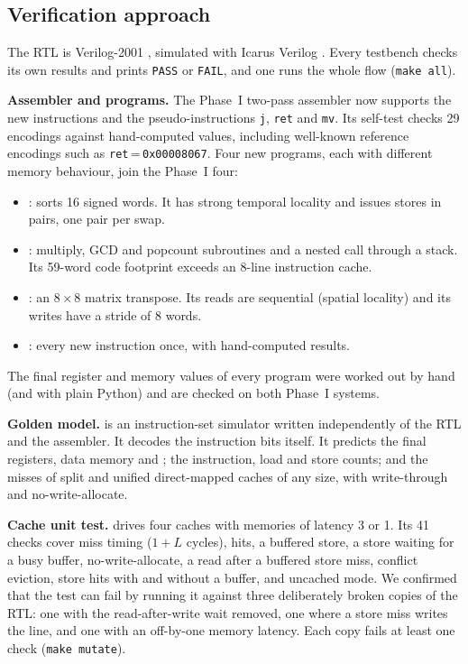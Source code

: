 \subsection{Verification approach}
The RTL is Verilog-2001 \cite{ieee1364}, simulated with Icarus Verilog \cite{icarus}. Every
testbench checks its own results and prints \texttt{PASS} or \texttt{FAIL}, and one
 runs the whole flow (\texttt{make all}).

\textbf{Assembler and programs.} The Phase~I two-pass assembler now supports the new
instructions and the pseudo-instructions \texttt{j}, \texttt{ret} and \texttt{mv}. Its
self-test checks 29 encodings against hand-computed values, including well-known reference
encodings such as \texttt{ret}\,=\,\texttt{0x00008067}. Four new programs, each with different
memory behaviour, join the Phase~I four:
\begin{itemize}
  \item {}: sorts 16 signed words. It has strong temporal locality and issues
        stores in pairs, one pair per swap.
  \item {}: multiply, GCD and popcount subroutines and a nested call through a
        stack. Its 59-word code footprint exceeds an 8-line instruction cache.
  \item {}: an $8\times8$ matrix transpose. Its reads are sequential (spatial
        locality) and its writes have a stride of 8 words.
  \item {}: every new instruction once, with hand-computed results.
\end{itemize}
The final register and memory values of every program were worked out by hand (and with plain
Python) and are checked on both Phase~I systems.

\textbf{Golden model.}  is an instruction-set simulator written independently
of the RTL and the assembler. It decodes the instruction bits itself. It predicts the final
registers, data memory and ; the instruction, load and store counts; and the
misses of split and unified direct-mapped caches of any size, with write-through and
no-write-allocate.

\textbf{Cache unit test.}  drives four caches with memories of latency 3 or 1.
Its 41 checks cover miss timing ($1+L$ cycles), hits, a buffered store, a store waiting for a
busy buffer, no-write-allocate, a read after a buffered store miss, conflict eviction, store
hits with and without a buffer, and uncached mode. We confirmed that the test can fail by
running it against three deliberately broken copies of the RTL: one with the read-after-write
wait removed, one where a store miss writes the line, and one with an off-by-one memory latency.
Each copy fails at least one check (\texttt{make mutate}).

